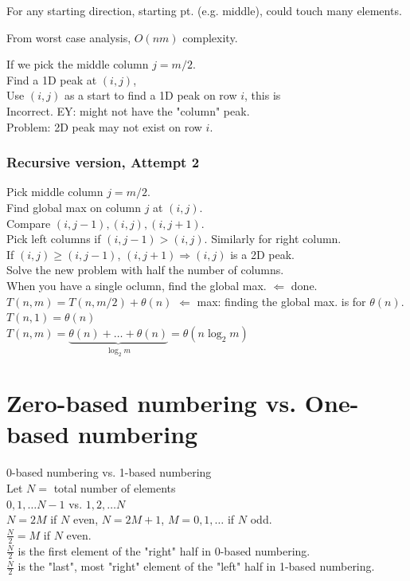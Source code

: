 \documentclass[10pt]{amsart}
\begin{document}
\begin{multicols*}{2}
For any starting direction, starting pt. (e.g. middle), could touch many elements. 

From worst case analysis, $O(nm)$ complexity.

If we pick the middle column $j = m/2$. \\
Find a 1D peak at $(i, j)$, \\
Use $(i, j)$ as a start to find a 1D peak on row $i$, this is\\
Incorrect. EY: might not have the "column" peak. \\
Problem: 2D peak may not exist on row $i$.\\

\subsubsection{Recursive version, Attempt 2}

Pick middle column $j =m/2$. \\
Find global max on column $j$ at $(i, j)$. \\
Compare $(i, j -1), (i, j), (i, j +1)$. \\
Pick left columns if $(i,j-1) > (i,j)$. Similarly for right column. \\

If $(i,j) \geq (i,j-1)$, $(i, j+1) \Longrightarrow (i,j)$ is a 2D peak. \\
Solve the new problem with half the number of columns. \\
When you have a single oclumn, find the global max. $\Longleftarrow$ done. \\

$T(n,m) = T(n,m/2) + \theta(n)$ $\Longleftarrow $ max: finding the global max. is for $\theta(n)$. \\
$T(n, 1) = \theta(n)$ \\
$T(n, m)  = \underbrace{\theta(n) + \dots + \theta(n)}_{\log_2{m} } = \theta(n\log_2{m})$ \\

\section{Zero-based numbering vs. One-based numbering}

0-based numbering vs. 1-based numbering \\
Let $N=$ total number of elements \\

$0,1, \dots N-1$ vs. $1, 2, \dots N$ \\
$N = 2M$ if $N$ even, $N = 2M+1$, $M=0,1, \dots $ if $N$ odd. \\
$\frac{N}{2} = M$ if $N$ even. \\
$\frac{N}{2}$ is the first element of the "right" half in $0$-based numbering. \\
$\frac{N}{2}$ is the "last", most "right" element of the "left" half in 1-based numbering. \\


\end{multicols*}
\end{document}
